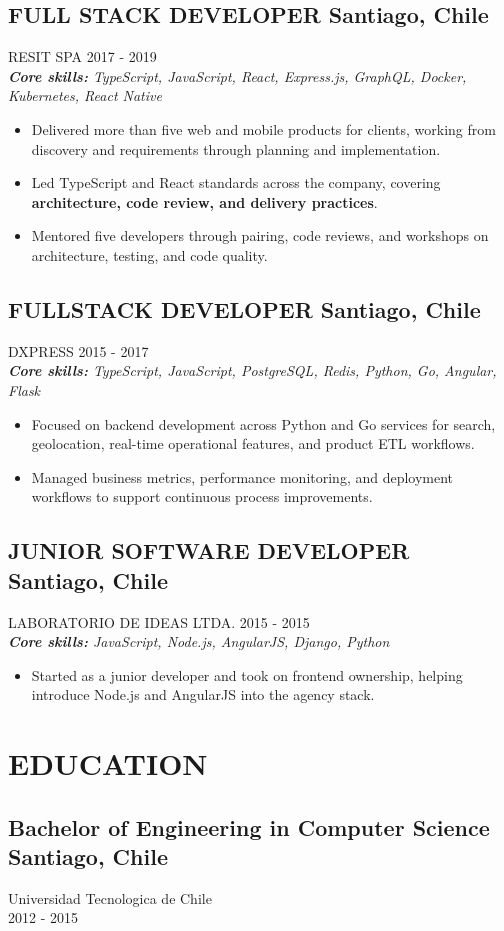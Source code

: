 \documentclass{article}
\newcommand{\SubHeading}[1]{
   \subsection*{#1}\vspace{-0.5em}
}
\newcommand{\WorkExperience}[2]{
   \subsection*{#1}
   \vspace{-1em}
   \uppercase{#2}
}
\newcommand{\Skills}[1]{
   \textit{\textbf{Core skills:} #1}
}
\begin{document}
\WorkExperience{FULL STACK DEVELOPER \hfill Santiago, Chile}{Resit SPA \hfill 2017 {-} 2019} \\
\Skills{TypeScript, JavaScript, React, Express.js, GraphQL, Docker, Kubernetes, React Native}
\begin{itemize}
	\item Delivered more than five web and mobile products for clients, working from discovery and requirements through planning and implementation.
	\item Led TypeScript and React standards across the company, covering \textbf{architecture, code review, and delivery practices}.
	\item Mentored five developers through pairing, code reviews, and workshops on architecture, testing, and code quality.
\end{itemize}

\WorkExperience{FULLSTACK DEVELOPER \hfill Santiago, Chile}{Dxpress \hfill 2015 {-} 2017} \\
\Skills{TypeScript, JavaScript, PostgreSQL, Redis, Python, Go, Angular, Flask}
\begin{itemize}
	\item Focused on backend development across Python and Go services for search, geolocation, real-time operational features, and product ETL workflows.
	\item Managed business metrics, performance monitoring, and deployment workflows to support continuous process improvements.
\end{itemize}

\WorkExperience{JUNIOR SOFTWARE DEVELOPER \hfill Santiago, Chile}{Laboratorio de Ideas Ltda. \hfill 2015 {-} 2015} \\
\Skills{JavaScript, Node.js, AngularJS, Django, Python}
\begin{itemize}
	\item Started as a junior developer and took on frontend ownership, helping introduce Node.js and AngularJS into the agency stack.
\end{itemize}

\section*{EDUCATION}
\SubHeading{Bachelor of Engineering in Computer Science \hfill Santiago, Chile}
Universidad Tecnologica de Chile \\[0.1em]
2012 {-} 2015
\end{document}
